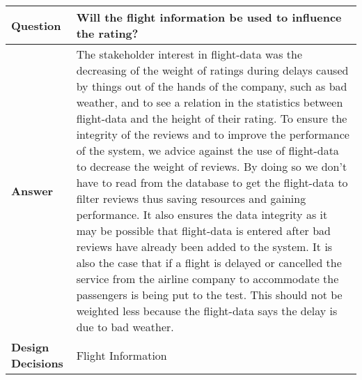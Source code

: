 \begin{longtable}{| l |  p{12cm} |}
\hline
\textbf{Question} & \textbf{Will the flight information be used to influence the rating?} \\ \hline
\textbf{Answer} & The stakeholder interest in flight-data was the decreasing of the weight of ratings during delays caused by things out of the hands of the company, such as bad weather, and to see a relation in the statistics between flight-data and the height of their rating. To ensure the integrity of the reviews and to improve the performance of the system, we advice against the use of flight-data to decrease the weight of reviews. By doing so we don't have to read from the database to get the flight-data to filter reviews thus saving resources and gaining performance. It also ensures the data integrity as it may be possible that flight-data is entered after bad reviews have already been added to the system. It is also the case that if a flight is delayed or cancelled the service from the airline company to accommodate the passengers is being put to the test. This should not be weighted less because the flight-data says the delay is due to bad weather.
 \\ \hline
\textbf{Design Decisions} & Flight Information \\ \hline
\end{longtable}
